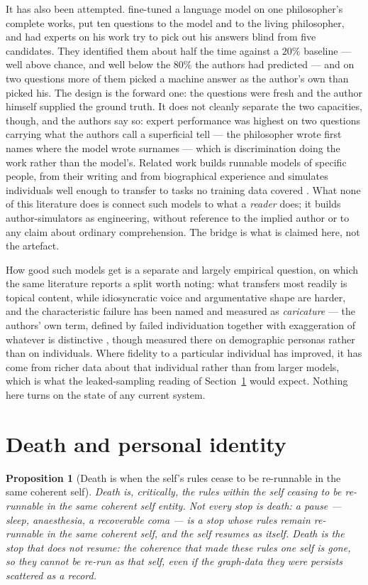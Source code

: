 \documentclass[11pt,a4paper]{article}
\newtheorem{proposition}[definition]{Proposition}
\theoremstyle{remark}\newtheorem{remark}[definition]{Remark}
\begin{document}
It has also been attempted. \citet{schwitzgebel2024} fine-tuned a language model on one
philosopher's complete works, put ten questions to the model and to the living philosopher, and
had experts on his work try to pick out his answers blind from five candidates. They identified
them about half the time against a $20\%$ baseline --- well above chance, and well below the
$80\%$ the authors had predicted --- and on two questions more of them picked a machine answer as the
author's own than picked his. The design is the forward one: the questions were fresh and the author
himself supplied the ground truth. It does not cleanly separate the two capacities, though, and
the authors say so: expert performance was highest on two questions carrying what the authors
call a superficial tell --- the philosopher wrote first names where the model wrote surnames --- which
is discrimination doing the work rather than the model's. Related work builds runnable models of specific
people, from their writing \citep{wang2025persona} and from biographical experience
\citep{shao2023} and simulates individuals well enough to transfer
to tasks no training data covered \citep{park2024}. What none of this literature does is connect
such models to what a \emph{reader} does; it builds author-simulators as engineering, without
reference to the implied author or to any claim about ordinary comprehension. The bridge is what
is claimed here, not the artefact.

How good such models get is a separate and largely empirical question, on which the same
literature reports a split worth noting: what transfers most readily is topical content, while
idiosyncratic voice and argumentative shape are harder, and the characteristic failure has been
named and measured as \emph{caricature} --- the authors' own term, defined by failed individuation
together with exaggeration of whatever is distinctive \citep{cheng2023}, though measured there on
demographic personas rather than on individuals. Where fidelity to a particular individual has improved,
it has come from richer data about that individual rather than from larger models, which is what
the leaked-sampling reading of Section~\ref{sec:death} would expect. Nothing here turns on the
state of any current system.

\section{Death and personal identity}\label{sec:death}
\begin{proposition}[Death is when the self's rules cease to be re-runnable in the same coherent self]\label{prop:death}
Death is, critically, the rules within the self ceasing to be re-runnable in the same
coherent self entity. Not every stop is death: a pause --- sleep, anaesthesia, a
recoverable coma --- is a stop whose rules remain re-runnable in the same coherent
self, and the self resumes as itself. Death is the stop that does not resume: the
coherence that made these rules one self is gone, so they cannot be re-run as that
self, even if the graph-data they were persists scattered as a record.
\end{proposition}
\end{document}

